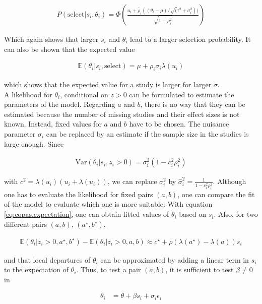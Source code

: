 \begin{align}
P(\textrm{select}|s_i, \theta_i) = %
\Phi(\frac{u_i + \tilde{\rho_i}((\theta_i - \mu)/\sqrt(\tau^2 + \sigma_i^2))}{\sqrt{1 - \tilde{\rho_i^2}}}) \nonumber
\end{align}

Which again shows that larger $s_i$ and $\theta_i$ lead to a larger selection probability. It can also be shown that the expected value 

\begin{align}
\mathbb{E}(\theta_i|s_i, \textrm{select}) = \mu + \rho_i\sigma_i\lambda(u_i) \label{eq:copas.expectation}
\end{align}

which shows that the expected value for a study is larger for larger $\sigma$. \\
A likelihood for $\theta_i$, conditional on $z>0$ can be formulated to estimate the parameters of the model. Regarding $a$ and $b$, there is no way that they can be estimated because the number of missing studies and their effect sizes is not known. Instead, fixed values for $a$ and $b$ have to be chosen.
The nuisance parameter $\sigma_i$ can be replaced by an estimate if the sample size in the studies is large enough. Since

\begin{align}
\textrm{Var}(\theta_i| s_i, z_i > 0) = \sigma_i^2 (1 - c_i^2\rho_i^2) \nonumber
\end{align}

with $c^2 = \lambda(u_i)(u_i + \lambda(u_i))$, we can replace $\sigma_i^2$ by $\hat{\sigma}_i^2 = \frac{1}{1-c_i^2\rho_i^2}$. Although one has to evaluate the likelihood for fixed pairs $(a,b)$, one can compare the fit of the model to evaluate which one is more suitable:
With equation \ref{eq:copas.expectation}, one can obtain fitted values of $\theta_i$ based on $s_i$. Also, for two different pairs $(a,b)$, $(a^\star, b^\star)$,

\begin{align}
\mathbb{E}(\theta_i|z_i > 0, a^\star, b^\star) - \mathbb{E}(\theta_i|z_i > 0, a, b) \approx c^\star + \rho(\lambda(a^\star) - \lambda(a))s_i \nonumber
\end{align}

and that local departures of $\theta_i$ can be approximated by adding a linear term in $s_i$ to the expectation of $\theta_i$. Thus, to test a pair $(a,b)$, it is sufficient to test $\beta \neq 0$ in

\begin{align}
\theta_i &= \theta + \beta s_i + \sigma_i \epsilon_i \nonumber
\end{align}

